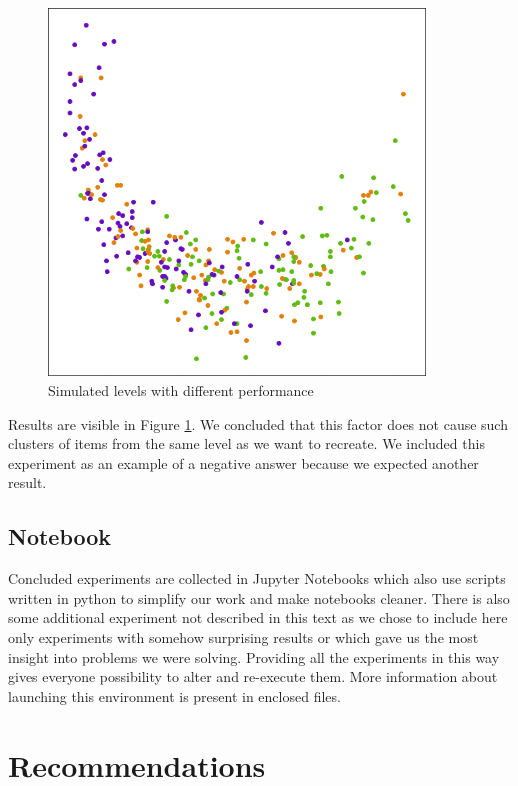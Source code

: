 \documentclass[
  digital, %
  table,   %
  nolof,     %
  nolot,     %
  nocover,
  color,
  final, %
]{fithesis3}
\begin{document}
\begin{figure}
  \includegraphics[width=10cm]{img/simulated_performance}
  \caption{Simulated levels with different performance}
  \label{fig:simulated_performance}
\end{figure}


Results are visible in Figure \ref{fig:simulated_performance}. We concluded that this factor does not cause such clusters of items from the same level as we want to recreate. We included this experiment as an example of a negative answer because we expected another result.


\section{Notebook}\label{notebook}

Concluded experiments are collected in Jupyter Notebooks which also use scripts written in python to simplify our work and make notebooks cleaner. There is also some additional experiment not described in this text as we chose to include here only experiments with somehow surprising results or which gave us the most insight into problems we were solving. Providing all the experiments in this way gives everyone possibility to alter and re-execute them. More information about launching this environment is present in enclosed files.

\chapter{Recommendations}\label{recommendations}
\end{document}
